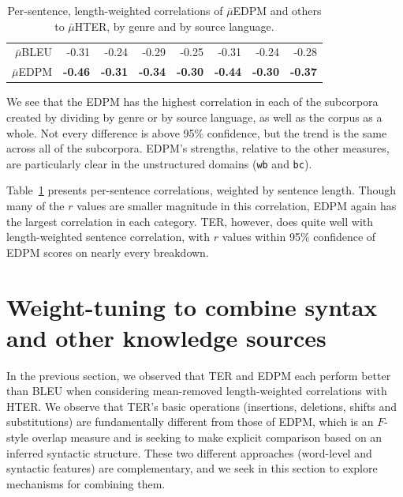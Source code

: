 \documentclass{kluwer}    %
\begin{document}
\begin{article}
\begin{subtable}
\begin{table}
\begin{tabular}{r|rrrr|rr|r}
      $\bar{\mu}$BLEU
      & -0.31 & -0.24  & -0.29 &  -0.25
      & -0.31  &  -0.24  & -0.28 \\
      $\bar{\mu}$EDPM
      & \textbf{-0.46} & \textbf{-0.31} & \textbf{-0.34} &
      \textbf{-0.30}
      & \textbf{-0.44} & \textbf{-0.30} & \textbf{-0.37} \\
      \hline
    \end{tabular}
    \caption{Per-sentence, length-weighted correlations of
      $\bar{\mu}$EDPM and others to $\bar{\mu}$HTER, by genre and by
      source language.}
    \label{tab:hterpersent}
  \end{table}
\end{subtable}
We see that the EDPM has the highest correlation in each of the
subcorpora created by dividing by genre or by source language, as well
as the corpus as a whole.  Not every difference is above 95\%
confidence, but the trend is the same across all of the
subcorpora. EDPM's strengths, relative to the other measures, are
particularly clear in the unstructured domains (\texttt{wb} and
\texttt{bc}).

Table~\ref{tab:hterpersent} presents per-sentence correlations,
weighted by sentence length.  Though many of the $r$ values are
smaller magnitude in this correlation, EDPM again has the largest
correlation in each category.  TER, however, does quite well with
length-weighted sentence correlation, with $r$ values within 95\%
confidence of EDPM scores on nearly every breakdown.

\section{Weight-tuning to combine syntax and other knowledge sources}
\label{sec:hter2}

In the previous section, we observed that TER and EDPM each perform
better than BLEU when considering mean-removed length-weighted
correlations with HTER.  We observe that TER's basic operations
(insertions, deletions, shifts and substitutions) are fundamentally
different from those of EDPM, which is an $F$-style overlap measure
and is seeking to make explicit comparison based on an inferred
syntactic structure.  These two different approaches (word-level and
syntactic features) are complementary, and we seek in this section to
explore mechanisms for combining them.


\end{article}
\end{document}
